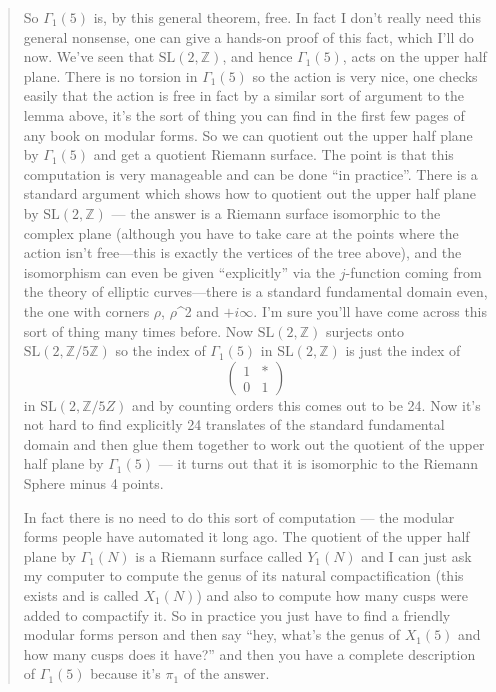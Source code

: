 \documentclass{article}
\begin{document}
\begin{quote}
So \(\Gamma_1(5)\) is, by this general theorem, free. In fact I don't
really need this general nonsense, one can give a hands-on proof of this
fact, which I'll do now. We've seen that \(\mathrm{SL}(2,\mathbb{Z})\),
and hence \(\Gamma_1(5)\), acts on the upper half plane. There is no
torsion in \(\Gamma_1(5)\) so the action is very nice, one checks easily
that the action is free in fact by a similar sort of argument to the
lemma above, it's the sort of thing you can find in the first few pages
of any book on modular forms. So we can quotient out the upper half
plane by \(\Gamma_1(5)\) and get a quotient Riemann surface. The point
is that this computation is very manageable and can be done ``in
practice''. There is a standard argument which shows how to quotient out
the upper half plane by \(\mathrm{SL}(2,\mathbb{Z})\) --- the answer is
a Riemann surface isomorphic to the complex plane (although you have to
take care at the points where the action isn't free---this is exactly
the vertices of the tree above), and the isomorphism can even be given
``explicitly'' via the \(j\)-function coming from the theory of elliptic
curves---there is a standard fundamental domain even, the one with
corners \(\rho\), \(\rho\)\^{}2 and \(+i\infty\). I'm sure you'll have
come across this sort of thing many times before. Now
\(\mathrm{SL}(2,\mathbb{Z})\) surjects onto
\(\mathrm{SL}(2,\mathbb{Z}/5\mathbb{Z})\) so the index of
\(\Gamma_1(5)\) in \(\mathrm{SL}(2,\mathbb{Z})\) is just the index of \[
  \left(\begin{array}{cc}1&*\\0&1\end{array}\right)
\] in \(\mathrm{SL}(2,\mathbb{Z}/5Z)\) and by counting orders this comes
out to be 24. Now it's not hard to find explicitly 24 translates of the
standard fundamental domain and then glue them together to work out the
quotient of the upper half plane by \(\Gamma_1(5)\) --- it turns out
that it is isomorphic to the Riemann Sphere minus 4 points.

In fact there is no need to do this sort of computation --- the modular
forms people have automated it long ago. The quotient of the upper half
plane by \(\Gamma_1(N)\) is a Riemann surface called \(Y_1(N)\) and I
can just ask my computer to compute the genus of its natural
compactification (this exists and is called \(X_1(N)\)) and also to
compute how many cusps were added to compactify it. So in practice you
just have to find a friendly modular forms person and then say ``hey,
what's the genus of \(X_1(5)\) and how many cusps does it have?'' and
then you have a complete description of \(\Gamma_1(5)\) because it's
\(\pi_1\) of the answer.


\end{quote}
\end{document}
